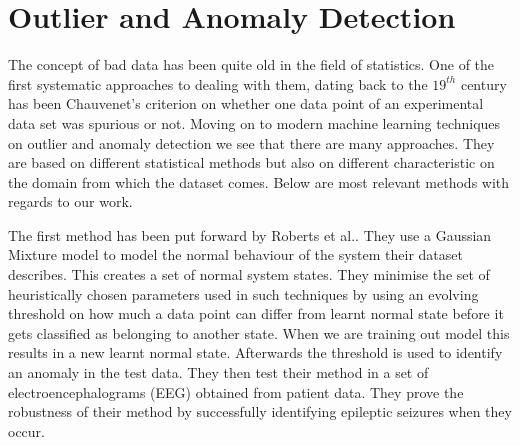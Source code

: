 \documentclass[reqno,openany,12pt]{amsbook}
\begin{document}
\section{Outlier and Anomaly Detection}

The concept of bad data has been quite old in the field of statistics. One of the first systematic approaches to dealing with them, dating back to the $19^{th}$ century has been Chauvenet's criterion on  whether one data point of an experimental data set was spurious or not. Moving on to modern machine learning techniques on outlier and anomaly detection we see that there are many approaches. They are based on different statistical methods but also on different characteristic on the domain from which the dataset comes. Below are most relevant methods with regards to our work.

The first method has been put forward by Roberts et al.\cite{out1}. 
They use a Gaussian Mixture model to model the normal behaviour of the system their dataset describes. This creates a set of normal system states. They minimise the set of heuristically chosen parameters used in such techniques by using an evolving threshold on how much a data point can differ from learnt normal state before it gets classified as belonging to another state. When we are training out model this results in a new learnt normal state. Afterwards the threshold is used to identify an anomaly in the test data. They then test their method in a set of electroencephalograms (EEG) obtained from patient data. They prove the robustness of their method by successfully identifying epileptic seizures 
when they occur.
\end{document}
